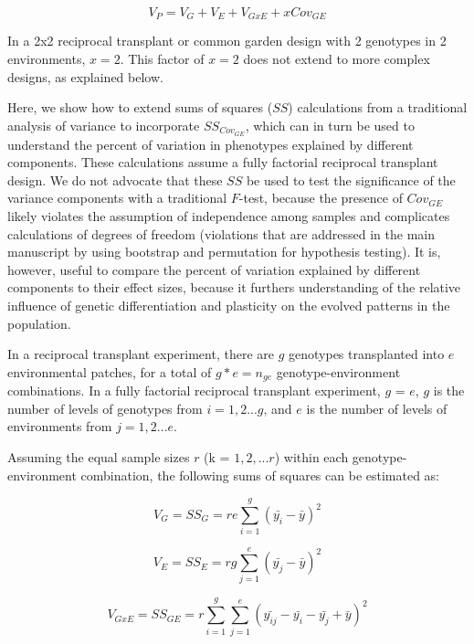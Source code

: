 \documentclass[11pt, oneside]{amsart}
\begin{document}
\begin{equation}
V_P = V_G + V_E + V_{GxE} + xCov_{GE} 
\end{equation}

In a 2x2 reciprocal transplant or common garden design with 2 genotypes in 2 environments, $x = 2$. This factor of $x = 2$ does not extend to more complex designs, as explained below.

Here, we show how to extend sums of squares ($SS$) calculations from a traditional analysis of variance to incorporate $SS_{Cov_{GE}}$, which can in turn be used to understand the percent of variation in phenotypes explained by different components.  These calculations assume a fully factorial reciprocal transplant design. We do not advocate that these $SS$ be used to test the significance of the variance components with a traditional $F$-test, because the presence of $Cov_{GE}$ likely violates the assumption of independence among samples and complicates calculations of degrees of freedom (violations that are addressed in the main manuscript by using bootstrap and permutation for hypothesis testing). It is, however, useful to compare the percent of variation explained by different components to their effect sizes, because it furthers understanding of the relative influence of genetic differentiation and plasticity on the evolved patterns in the population.

In a reciprocal transplant experiment, there are $g$ genotypes transplanted into $e$ environmental patches, for a total of $g*e = n_{ge}$ genotype-environment combinations. In a fully factorial reciprocal transplant experiment, $g$ = $e$, $g$ is the number of levels of genotypes from $i = 1,2... g$, and $e$ is the number of levels of environments from $j = 1,2... e$.

Assuming the equal sample sizes $r$ (k = $1, 2, ...r$) within each genotype-environment combination, the following sums of squares can be estimated as:

\begin{equation}
V_G = SS_G = re\sum_{i=1}^g (\bar{y_i} - \bar{y})^2
\end{equation}

\begin{equation}
V_E = SS_E =  rg\sum_{j=1}^e (\bar{y_j} - \bar{y})^2 
\end{equation}

\begin{equation}
V_{GxE} = SS_{GE} = r \sum_{i=1}^g \sum_{j=1}^e (\bar{y_{ij}} - \bar{y_i} - \bar{y_j} + \bar{y})^2
\end{equation}
\end{document}
